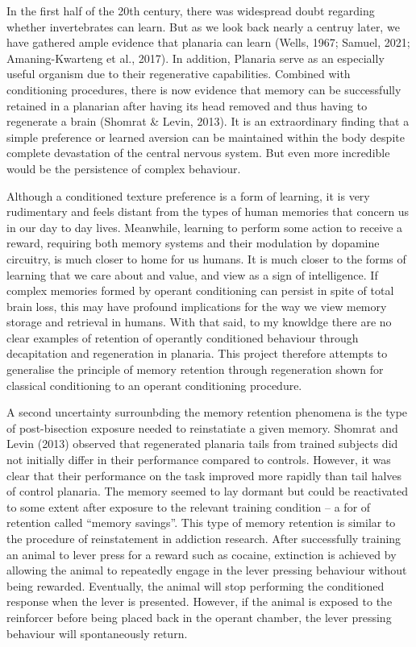 \documentclass[
  letterpaper,
  DIV=11,
  numbers=noendperiod,
  oneside]{scrartcl}
\begin{document}
In the first half of the 20th century, there was widespread doubt
regarding whether invertebrates can learn. But as we look back nearly a
centruy later, we have gathered ample evidence that planaria can learn
(Wells, 1967; Samuel, 2021; Amaning-Kwarteng et al., 2017). In addition,
Planaria serve as an especially useful organism due to their
regenerative capabilities. Combined with conditioning procedures, there
is now evidence that memory can be successfully retained in a planarian
after having its head removed and thus having to regenerate a brain
(Shomrat \& Levin, 2013). It is an extraordinary finding that a simple
preference or learned aversion can be maintained within the body despite
complete devastation of the central nervous system. But even more
incredible would be the persistence of complex behaviour.

Although a conditioned texture preference is a form of learning, it is
very rudimentary and feels distant from the types of human memories that
concern us in our day to day lives. Meanwhile, learning to perform some
action to receive a reward, requiring both memory systems and their
modulation by dopamine circuitry, is much closer to home for us humans.
It is much closer to the forms of learning that we care about and value,
and view as a sign of intelligence. If complex memories formed by
operant conditioning can persist in spite of total brain loss, this may
have profound implications for the way we view memory storage and
retrieval in humans. With that said, to my knowldge there are no clear
examples of retention of operantly conditioned behaviour through
decapitation and regeneration in planaria. This project therefore
attempts to generalise the principle of memory retention through
regeneration shown for classical conditioning to an operant conditioning
procedure.

A second uncertainty surrounbding the memory retention phenomena is the
type of post-bisection exposure needed to reinstatiate a given memory.
Shomrat and Levin (2013) observed that regenerated planaria tails from
trained subjects did not initially differ in their performance compared
to controls. However, it was clear that their performance on the task
improved more rapidly than tail halves of control planaria. The memory
seemed to lay dormant but could be reactivated to some extent after
exposure to the relevant training condition -- a for of retention called
``memory savings''. This type of memory retention is similar to the
procedure of reinstatement in addiction research. After successfully
training an animal to lever press for a reward such as cocaine,
extinction is achieved by allowing the animal to repeatedly engage in
the lever pressing behaviour without being rewarded. Eventually, the
animal will stop performing the conditioned response when the lever is
presented. However, if the animal is exposed to the reinforcer before
being placed back in the operant chamber, the lever pressing behaviour
will spontaneously return.
\end{document}

